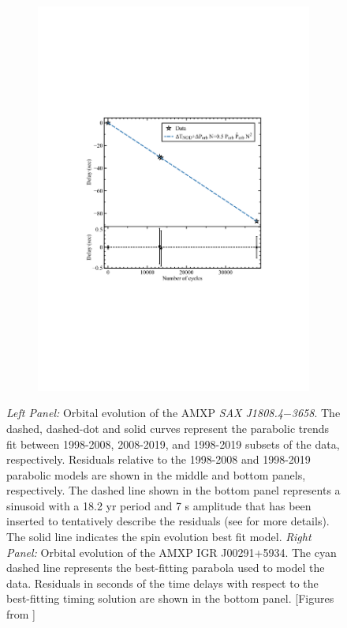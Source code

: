 \documentclass[graybox]{svmult}
\def \saxj{{\em SAX J1808.4$-$3658\xspace}}
\begin{document}
\begin{figure}
\begin{subfigure}{.5\textwidth}
  \includegraphics[width=1.1\linewidth]{REVIEW_AMXP/00291_orb_2}
  \label{fig:sfig2}
\end{subfigure}
\caption{\textit{Left Panel:} Orbital evolution of the AMXP \saxj{}. The dashed, dashed-dot and solid curves represent the parabolic trends fit between 1998-2008, 2008-2019, and 1998-2019 subsets of the data, respectively. Residuals relative to the 1998-2008 and 1998-2019 parabolic models are shown in the middle and bottom panels, respectively. The dashed line shown in the bottom panel represents a sinusoid with a 18.2 yr period and 7 s amplitude that has been inserted to tentatively describe the residuals (see \cite{Bult2019c} for more details). The solid line indicates the spin evolution best fit model. \textit{Right Panel:} Orbital evolution of the AMXP IGR J00291+5934. The cyan dashed line represents the best-fitting parabola used to model the data. Residuals in seconds of the time delays with respect to the best-fitting timing solution are shown in the bottom panel. [Figures from \cite{Bult2019c,Sanna2017d}]}
\label{fig:orb_evo}
\end{figure}
\end{document}
